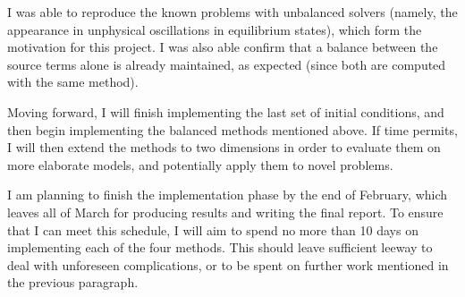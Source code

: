 \documentclass[a4paper,onecolumn,11pt]{article}
\begin{document}
I was able to reproduce the known problems with unbalanced solvers (namely, the appearance in unphysical oscillations in equilibrium states), which form the motivation for this project. I was also able confirm that a balance between the source terms alone is already maintained, as expected (since both are computed with the same method).

Moving forward, I will finish implementing the last set of initial conditions, and then begin implementing the balanced methods mentioned above. If time permits, I will then extend the methods to two dimensions in order to evaluate them on more elaborate models, and potentially apply them to novel problems.

I am planning to finish the implementation phase by the end of February, which leaves all of March for producing results and writing the final report. To ensure that I can meet this schedule, I will aim to spend no more than 10 days on implementing each of the four methods. This should leave sufficient leeway to deal with unforeseen complications, or to be spent on further work mentioned in the previous paragraph.



\end{document}
